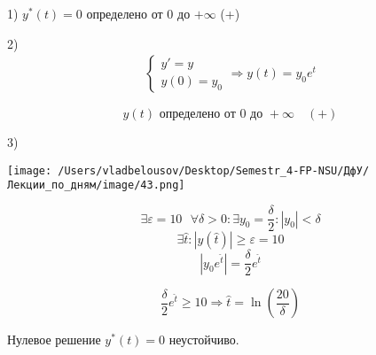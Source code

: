 \documentclass[12pt, a4paper]{report}
\begin{document}
1) \( y^*  (t ) = 0\)  определено от \( 0 \) до \( + \infty  \)  (+)

2) \[ \begin{aligned}
\begin{cases}
y ' = y \\ 
y(0 ) = y_0 
\end{cases}
\Rightarrow y(t ) = y_0 e^{t } 
\end{aligned} \] 

\[ y(t) \text{ определено от } 0 \text{ до }  + \infty  \quad  (+)  \] 

3) 

\begin{center}
    \texttt{[image: /Users/vladbelousov/Desktop/Semestr\_4-FP-NSU/ДфУ/Лекции\_по\_дням/image/43.png]}
\end{center}

\[ \exists  \varepsilon = 10 \text{ }  \forall  \delta > 0 : \exists  y_0= \frac{\delta}{2 } : \left\lvert y_0  \right\rvert < \delta  \] 
\[ \exists \hat{ t }  : \left\lvert y(\hat{t }  ) \right\rvert \ge \varepsilon = 10 \] 
\[ \left\lvert y_0 e^{\hat{t } }  \right\rvert = \frac{\delta}{2 } e^{\hat{ t } } \] 

\[ \frac{\delta}{2 }  e^{\hat{ t } } \ge 10 \Rightarrow \hat{ t }  = \ln \left( \frac{20}{\delta}  \right)  \] 

Нулевое решение \( y^* (t ) = 0\)  неустойчиво.

\ifdefined\mainfile
\else
    
\end{document}
